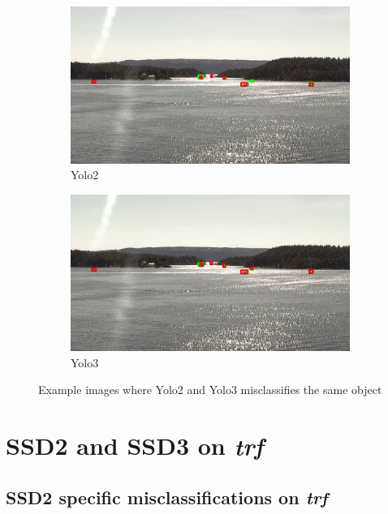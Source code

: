 \begin{figure}[h!]
\begin{subfigure}{.5\textwidth}
  \centering
  \includegraphics[width=0.9\linewidth]{results/case_buildings/yolo23/samemistake/yolo2/selected_08_11_frame3200.jpg}
  \caption{Yolo2}
\end{subfigure}%
\begin{subfigure}{.5\textwidth}
  \centering
  \includegraphics[width=.9\linewidth]{results/case_buildings/yolo23/samemistake/yolo3/selected_08_11_frame3200.jpg}
  \caption{Yolo3}
\end{subfigure}
\caption{Example images where Yolo2 and Yolo3 misclassifies the same object}
\label{img:yolo2_better}

\end{figure}

\newpage

\section{SSD2 and SSD3 on \textit{trf}}

\subsection{SSD2 specific misclassifications on \textit{trf}}
\label{sec:trf_ssd_bigbox}

